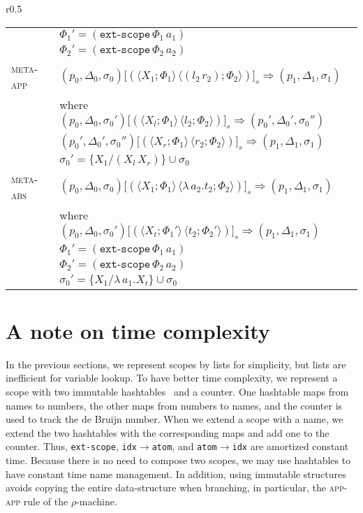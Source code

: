 \documentclass[a4paper,UKenglish]{lipics-v2016}
\newcommand{\clos}[2] {
  \langle #1; #2 \rangle
}
\newcommand{\app}[2] {
  (#1\, #2)
}
\newcommand{\cframe}[7] {
  (#1, #2, #3) \lbrack #4 \rbrack_s\Rightarrow (#5, #6, #7)
}
\newcommand{\pr}[2] {
 (#1\, #2)
}
\newcommand{\bd}[2] {
 #1/ #2
}
\newcommand*{\transname}[1]{\textsc{#1}}
\begin{document}
\begin{wrapfigure}{r}{0.5\textwidth}
\begin{tabular}{l l}
    & \hspace{8mm} $\Phi_1' = (\texttt{ext-scope}\, \Phi_1\, a_1)$ \\
    & \hspace{8mm} $\Phi_2' = (\texttt{ext-scope}\, \Phi_2\, a_2)$ \\
    \transname{meta-app} & $\cframe{p_0}{\Delta_0}{\sigma_0}{\pr{\clos{X_1}{\Phi_1}}{\clos{\app{l_2}{r_2}}{\Phi_2}}}{p_1}{\Delta_1}{\sigma_1}$ \\ 
    & where $\cframe{p_0}{\Delta_0}{\sigma_0'}{\pr{\clos{X_l}{\Phi_1}}{\clos{l_2}{\Phi_2}}}{p_0'}{\Delta_0'}{\sigma_0''}$ \\
    & \hspace{8mm} $\cframe{p_0'}{\Delta_0'}{\sigma_0''}{\pr{\clos{X_r}{\Phi_1}}{\clos{r_2}{\Phi_2}}}{p_1}{\Delta_1}{\sigma_1}$ \\
    & \hspace{8mm} $\sigma_0' = \{\bd{X_1}{\app{X_l}{X_r}}\} \cup \sigma_0$ \\
   \transname{meta-abs} & $\cframe{p_0}{\Delta_0}{\sigma_0}{\pr{\clos{X_1}{\Phi_1}}{\clos{\lambda\,a_2.t_2}{\Phi_2}}}{p_1}{\Delta_1}{\sigma_1}$ \\ 
    & where $\cframe{p_0}{\Delta_0}{\sigma_0'}{\pr{\clos{X_t}{\Phi_1'}}{\clos{t_2}{\Phi_2'}}}{p_1}{\Delta_1}{\sigma_1}$ \\
    & \hspace{8mm} $\Phi_1' = (\texttt{ext-scope}\, \Phi_1\, a_1)$ \\
    & \hspace{8mm} $\Phi_2' = (\texttt{ext-scope}\, \Phi_2\, a_2)$ \\
    & \hspace{8mm} $\sigma_0' = \{\bd{X_1}{\lambda\,a_1.X_t}\} \cup \sigma_0$ \\

  \end{tabular}
\end{wrapfigure}

\section{A note on time complexity}
    \label{efficiency}
    In the previous sections, we represent scopes by lists for simplicity,
    but lists are inefficient for variable lookup.
    To have better time complexity,
    we represent a scope with two immutable hashtables~\cite{bagwell_ideal_2001} and a counter.
    One hashtable maps from names to numbers,
    the other maps from numbers to names,
    and the counter is used to track the de Bruijn number.
    When we extend a scope with a name,
    we extend the two hashtables with the corresponding maps and add one to the counter.
    Thus, \texttt{ext-scope}, \texttt{idx$\rightarrow$atom}, and \texttt{atom$\rightarrow$idx}
    are amortized constant time.
    Because there is no need to compose two scopes,
    we may use hashtables to have constant time name management.
    In addition, using immutable structures avoids copying the entire data-structure
    when branching, in particular, the \transname{app-app} rule of the $\rho$-machine.
\end{document}
